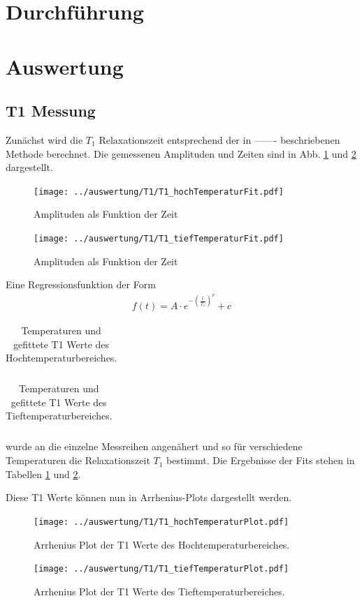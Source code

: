 \section{Durchführung}

\section{Auswertung}
\subsection{T1 Messung}
Zunächst wird die $T_1$ Relaxationszeit entsprechend der in ------- beschriebenen Methode berechnet. Die gemessenen Amplituden und Zeiten sind in Abb. \ref{pic_T1_hoch} und \ref{pic_T1_tief} dargestellt. 

\begin{figure}[htbp]
	\texttt{[image: ../auswertung/T1/T1\_hochTemperaturFit.pdf]}
	\caption{Amplituden als Funktion der Zeit}
	\label{pic_T1_hoch}
\end{figure}
\begin{figure}[htbp]
	\texttt{[image: ../auswertung/T1/T1\_tiefTemperaturFit.pdf]}
	\caption{Amplituden als Funktion der Zeit}
	\label{pic_T1_tief}
\end{figure}
Eine Regressionsfunktion der Form 
\begin{align}
	f(t) = A\cdot e^{-\left(\frac{t}{T_1}\right)^\nu}+c
\end{align}
\begin{table}[htbp]
	\begin{tabular}{|c|c|}
	
	\end{tabular}
	\caption{Temperaturen und gefittete T1 Werte des Hochtemperaturbereiches.}
	\label{tab:T1_hoch}
\end{table}
\begin{table}[htbp]
	\begin{tabular}{|c|c|}
		
	\end{tabular}
	\caption{Temperaturen und gefittete T1 Werte des Tieftemperaturbereiches.}
	\label{tab:T1_tief}
\end{table}
wurde an die einzelne Messreihen angenähert und so für verschiedene Temperaturen die Relaxationszeit $T_1$ bestimmt. Die Ergebnisse der Fits stehen in Tabellen \ref{tab:T1_hoch} und \ref{tab:T1_tief}.

Diese T1 Werte können nun in Arrhenius-Plots dargestellt werden.
\begin{figure}[htbp]
	\texttt{[image: ../auswertung/T1/T1\_hochTemperaturPlot.pdf]}
	\caption{Arrhenius Plot der T1 Werte des Hochtemperaturbereiches.}
	\label{pic_T1Arr_hoch}
\end{figure}
\begin{figure}[htbp]
	\texttt{[image: ../auswertung/T1/T1\_tiefTemperaturPlot.pdf]}
	\caption{Arrhenius Plot der T1 Werte des Tieftemperaturbereiches.}
	\label{pic_T1Arr_tief}
\end{figure}

